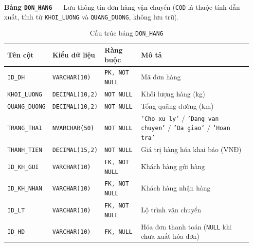 \documentclass[11pt]{report}
\begin{document}
\noindent\textbf{Bảng \texttt{DON\_HANG}} --- Lưu thông tin đơn hàng vận chuyển (\texttt{COD} là thuộc tính dẫn xuất, tính từ \texttt{KHOI\_LUONG} và \texttt{QUANG\_DUONG}, không lưu trữ).
\begin{table}[H]
    \centering
    \renewcommand{\tabularxcolumn}[1]{m{#1}}
    \begin{tabularx}{\textwidth}{|l|l|l|>{\raggedright\arraybackslash}X|} \hline
        \rowcolor{teal!30}
        \textbf{Tên cột} & \textbf{Kiểu dữ liệu} & \textbf{Ràng buộc} & \textbf{Mô tả} \\ \hline
        \texttt{ID\_DH}       & \texttt{VARCHAR(10)}   & \texttt{PK, NOT NULL}   & Mã đơn hàng \\ \hline
        \texttt{KHOI\_LUONG}  & \texttt{DECIMAL(10,2)} & \texttt{NOT NULL}       & Khối lượng hàng (kg) \\ \hline
        \texttt{QUANG\_DUONG} & \texttt{DECIMAL(10,2)} & \texttt{NOT NULL}       & Tổng quãng đường (km) \\ \hline
        \texttt{TRANG\_THAI}  & \texttt{NVARCHAR(50)}  & \texttt{NOT NULL}       & \texttt{'Cho xu ly'} / \texttt{'Dang van chuyen'} / \texttt{'Da giao'} / \texttt{'Hoan tra'} \\ \hline
        \texttt{THANH\_TIEN}  & \texttt{DECIMAL(15,2)} & \texttt{NOT NULL}       & Giá trị hàng hóa khai báo (VNĐ) \\ \hline
        \texttt{ID\_KH\_GUI}  & \texttt{VARCHAR(10)}   & \texttt{FK, NOT NULL}   & Khách hàng gửi hàng \\ \hline
        \texttt{ID\_KH\_NHAN} & \texttt{VARCHAR(10)}   & \texttt{FK, NOT NULL}   & Khách hàng nhận hàng \\ \hline
        \texttt{ID\_LT}       & \texttt{VARCHAR(10)}   & \texttt{FK, NOT NULL}   & Lộ trình vận chuyển \\ \hline
        \texttt{ID\_HD}       & \texttt{VARCHAR(10)}   & \texttt{FK, NULL} & Hóa đơn thanh toán (\texttt{NULL} khi chưa xuất hóa đơn) \\ \hline
    \end{tabularx}
    \caption{Cấu trúc bảng \texttt{DON\_HANG}}
    \label{tab:str_donhang}
\end{table}
\end{document}
